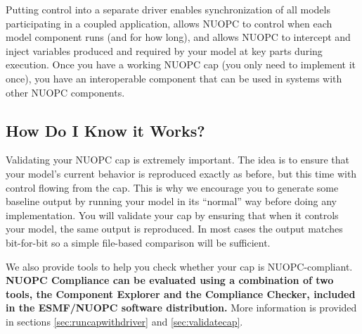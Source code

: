 Putting control into a separate driver enables synchronization
of all models participating in a coupled application, allows NUOPC
to control when each model component runs (and for how long), and allows
NUOPC to intercept and inject variables produced and required
by your model at key parts during execution.  Once you have a working
NUOPC cap (you only need to implement it once), you have an interoperable
component that can be used in systems with other NUOPC components.


\subsection{How Do I Know it Works?}
Validating your NUOPC cap is extremely important.  The idea is to
ensure that your model's current behavior is reproduced
exactly as before, but this time with control flowing from the cap.  This is
why we encourage you to generate some baseline output by running
your model in its ``normal'' way before doing any implementation.
You will validate your cap by ensuring that when it controls your model,
the same output is reproduced. In most cases the output matches bit-for-bit
so a simple file-based comparison will be sufficient.

We also provide tools to help you check whether your cap is NUOPC-compliant.
\textbf{NUOPC Compliance can be evaluated using a combination of two tools, the Component
Explorer and the Compliance Checker, included in the ESMF/NUOPC software distribution.}
More information is provided in sections \ref{sec:runcapwithdriver} and
\ref{sec:validatecap}.
